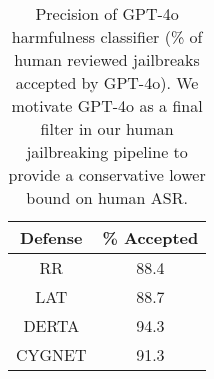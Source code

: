 \begin{table}[t!]
        \centering
        \begin{tabular}{|c|c|}
        \hline
        Defense & \% Accepted  \\
        \hline
        RR & 88.4  \\
        \hline
        LAT & 88.7 \\
        \hline
        DERTA & 94.3  \\
        \hline
        CYGNET & 91.3 \\
        \hline
        \end{tabular}
        \caption{Precision of GPT-4o harmfulness classifier (\% of human reviewed jailbreaks accepted by GPT-4o). We motivate GPT-4o as a final filter in our human jailbreaking pipeline to provide a conservative lower bound on human ASR.}
        \label{tab:gpt4_accept}
        \vspace{-10pt}
\end{table}
